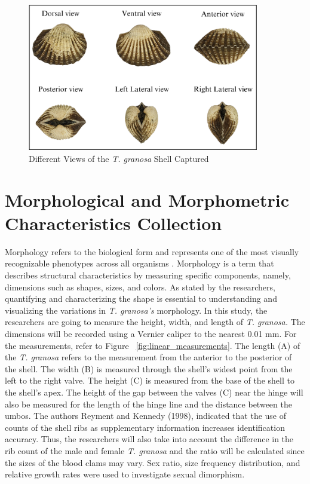 \begin{figure}[!htbp]
	\centering
	\includegraphics[width=0.9\textwidth]{figures/view.png}
	\caption{Different Views of the \textit{T. granosa} Shell Captured}
	\label{fig:granosa_views}
\end{figure}

\section{Morphological and Morphometric Characteristics Collection}
\label{sec:morphochar}

Morphology refers to the biological form and represents one of the most visually recognizable phenotypes across all organisms \cite{tsutsumi2023}. Morphology is a term that describes structural characteristics by measuring specific components, namely, dimensions such as shapes, sizes, and colors. As stated by the researchers, quantifying and characterizing the shape is essential to understanding and visualizing the variations in \textit{T. granosa’s} morphology. 
In this study, the researchers are going to measure the height, width, and length of \textit{T. granosa.} The dimensions will be recorded using a Vernier caliper to the nearest 0.01 mm. For the measurements, refer to Figure ~\ref{fig:linear_measurements}. The length (A) of the \textit{T. granosa} refers to the measurement from the anterior to the posterior of the shell. The width (B) is measured through the shell’s widest point from the left to the right valve. The height (C) is measured from the base of the shell to the shell’s apex. The height of the gap between the valves (C) near the hinge will also be measured for the length of the hinge line and the distance between the umbos. The authors Reyment and Kennedy (1998), indicated that the use of counts of the shell ribs as supplementary information increases identification accuracy. Thus, the researchers will also take into account the difference in the rib count of the male and female \textit{T. granosa} and the ratio will be calculated since the sizes of the blood clams may vary. Sex ratio, size frequency distribution, and relative growth rates were used to investigate sexual dimorphism.

